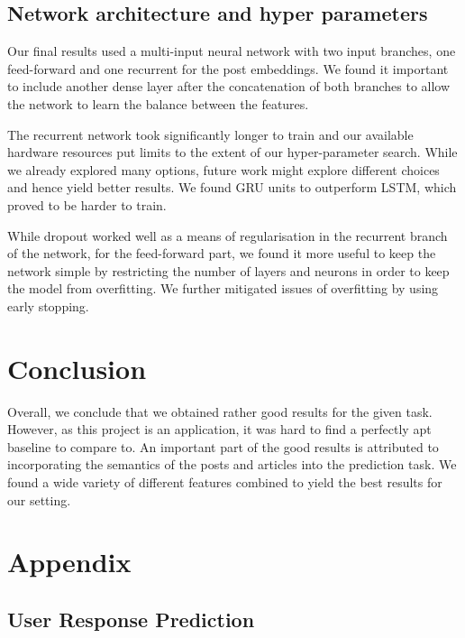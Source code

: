 \documentclass[acmsmall]{acmart}
\begin{document}
\subsection{Network architecture and hyper parameters}
Our final results used a multi-input neural network with two input branches, one feed-forward and one recurrent for the post embeddings. We found it important to include another dense layer after the concatenation of both branches to allow the network to learn the balance between the features.

The recurrent network took significantly longer to train and our available hardware resources put limits to the extent of our hyper-parameter search. While we already explored many options, future work might explore different choices and hence yield better results. We found GRU units to outperform LSTM, which proved to be harder to train. 

While dropout worked well as a means of regularisation in the recurrent branch of the network, for the feed-forward part, we found it more useful to keep the network simple by restricting the number of layers and neurons in order to keep the model from overfitting. We further mitigated issues of overfitting by using early stopping.

\section{Conclusion}

Overall, we conclude that we obtained rather good results for the given task. However, as this project is an application, it was hard to find a perfectly apt baseline to compare to. An important part of the good results is attributed to incorporating the semantics of the posts and articles into the prediction task. We found a wide variety of different features combined to yield the best results for our setting. 



\section{Appendix}


\subsection{User Response Prediction}
\end{document}
